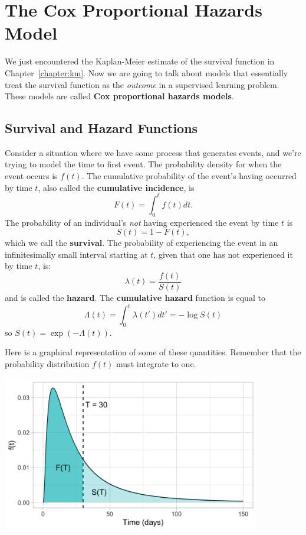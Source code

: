 \chapter{The Cox Proportional Hazards Model \label{chapter:cox}}

We just encountered the Kaplan-Meier estimate of the survival function in Chapter~\ref{chapter:km}. Now we are going to talk about models that essentially treat the survival function as the \emph{outcome} in a supervised learning problem. These models are called \textbf{Cox proportional hazards models}.


\section{Survival and Hazard Functions}

Consider a situation where we have some process that generates events, and we're trying to model the time to first event. The probability density for when the event occurs is $f(t)$. The cumulative probability of the event's having occurred by time $t$, also called the \textbf{cumulative incidence}, is
$$ F(t) = \int_0^t f(t) dt.$$
The probability of an individual's \emph{not} having experienced the event by time $t$ is
$$ S(t) = 1 - F(t), $$
which we call the \textbf{survival}. The probability of experiencing the event in an infinitesimally small interval starting at $t$, given that one has not experienced it by time $t$, is:
$$ \lambda(t) = \frac{f(t)}{S(t)} $$
and is called the \textbf{hazard}. The \textbf{cumulative hazard} function is equal to
$$ \Lambda(t) = \int_0^t \lambda(t') dt' = -\log S(t) $$
so $S(t) = \exp(-\Lambda(t))$. 

Here is a graphical representation of some of these quantities. Remember that the probability distribution $f(t)$ must integrate to one.

\begin{center}
\includegraphics[width=0.85\textwidth]{img/survival-function-example-fx.png}
\end{center}

